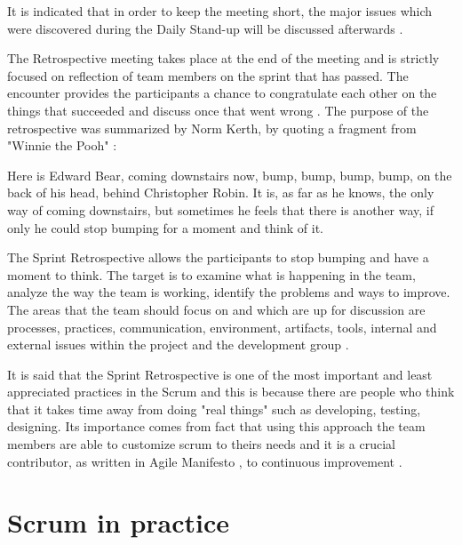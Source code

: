 It is indicated that in order to keep the meeting short, the major issues which were discovered during the Daily Stand-up will be discussed afterwards \cite{DotNetScrumBook}.

The Retrospective meeting takes place at the end of the meeting and is strictly focused on reflection of team members on the sprint that has passed. The encounter provides the participants a chance to congratulate each other on the things that succeeded and discuss once that went wrong \cite{DotNetScrumBook}. The purpose of the retrospective was summarized by Norm Kerth, by quoting a fragment from "Winnie the Pooh" \cite{ScrumBook}:
\begin{displayquote}
Here is Edward Bear, coming downstairs now, bump, bump, bump, bump, on the back of his head, behind Christopher Robin. It is, as far as he knows, the only way of coming downstairs, but sometimes he feels that there is another way, if only he could stop bumping for a moment and think of it.
\end{displayquote}

The Sprint Retrospective allows the participants to stop bumping and have a moment to think. The target is to examine what is happening in the team, analyze the way the team is working, identify the problems and ways to improve. The areas that the team should focus on and which are up for discussion are processes, practices, communication, environment, artifacts, tools, internal and external issues within the project and the development group \cite{ScrumBook}.

It is said that the Sprint Retrospective is one of the most important and least appreciated practices in the Scrum and this is because there are people who think that it takes time away from doing "real things" such as developing, testing, designing. Its importance comes from fact that using this approach the team members are able to customize scrum to theirs needs and it is a crucial contributor, as written in Agile Manifesto \cite{AgileManifesto}, to continuous improvement \cite{ScrumBook}.

\section{Scrum in practice}

